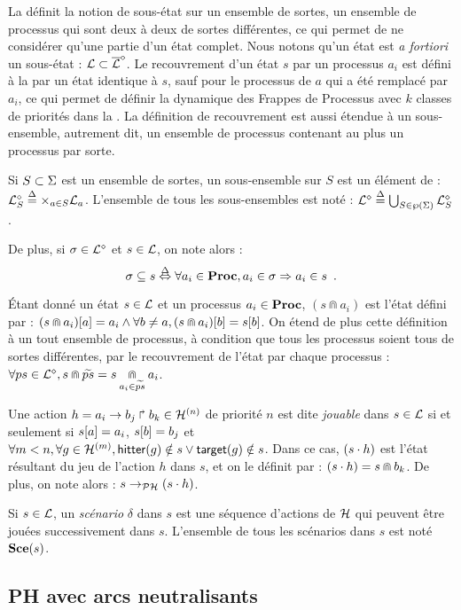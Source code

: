 La  définit la notion de sous-état sur un ensemble de sortes,
\cad un ensemble de processus qui sont deux à deux de sortes différentes,
ce qui permet de ne considérer qu'une partie d'un état complet.
Nous notons qu'un état est \textit{a fortiori} un sous-état : $\PHl \subset \PHsubl$.
Le recouvrement d'un état $s$ par un processus $a_i$ est défini à la 
par un état identique à $s$, sauf pour le processus de $a$ qui a été remplacé par $a_i$,
ce qui permet de définir la dynamique des Frappes de Processus avec $k$ classes de priorités
dans la .
La définition de recouvrement est aussi étendue à un sous-ensemble,
autrement dit, un ensemble de processus contenant au plus un processus par sorte.

\begin{definition}
\label{def:substate}
  Si $S \subset \PHs$ est un ensemble de sortes, un sous-ensemble sur $S$ est un élément de :
  $\PHsubl[\PHl]_S \DEF \bigtimes{a \in S} \PHl_a$.
  L'ensemble de tous les sous-ensembles est noté :
  $\PHsubl[\PHl] \DEF \bigcup_{S \in\powerset(\PHs)} \PHsubl[\PHl]_S$.
  
  \noindent
  De plus, si $\mysigma \in \PHsubl[\PHl]$ et $s \in \PHl$, on note alors :
  \[\mysigma \subseteq s \EQDEF \forall a_i \in \Proc, a_i \in \mysigma \Rightarrow a_i \in s
    \enspace.\]
\end{definition}
%
\begin{definition}[$\Cap : \PHl \times \PHproc \rightarrow \PHl$]
\label{def:statecap}
  Étant donné un état $s \in \PHl$ et un processus $a_i \in \PHproc$,
  $(s \Cap a_i)$ est l'état défini par :
  $\PHget{(s \Cap a_i)}{a} = a_i \wedge \forall b \neq a, \PHget{(s \Cap a_i)}{b} = \PHget{s}{b}$.
  On étend de plus cette définition à un tout ensemble de processus,
  à condition que tous les processus soient tous de sortes différentes,
  par le recouvrement de l'état par chaque processus :
  $\forall ps \in \PHsubl[\PHl], s \Cap \toset{ps} = s \underset{a_i \in \toset{ps}}{\Cap} a_i$.
\end{definition}
%
\begin{definition}
\label{def:play}
  Une action $h = \PHhit{a_i}{b_j}{b_k} \in \PHa^{(n)}$ de priorité $n$ est dite \emph{jouable}
  dans $s \in \PHl$ si et seulement si $\PHget{s}{a} = a_i$, $\PHget{s}{b} = b_j$
  et $\forall m < n, \forall g \in \PHa^{(m)}, \PHhitter(g) \notin s \vee \PHtarget(g) \notin s$.
  Dans ce cas, $(s \PHplay h)$ est l'état résultant du jeu de l'action $h$ dans $s$,
  et on le définit par : $(s \PHplay h) = s \Cap b_k$.
  De plus, on note alors : $s \PHPtrans (s \PHplay h)$.

  Si $s \in \PHl$, un \emph{scénario} $\delta$ dans $s$
  est une séquence d'actions de $\PHh$ qui peuvent être jouées successivement dans $s$.
  L'ensemble de tous les scénarios dans $s$ est noté $\Sce(s)$.
\end{definition}

\subsection{PH avec arcs neutralisants}
